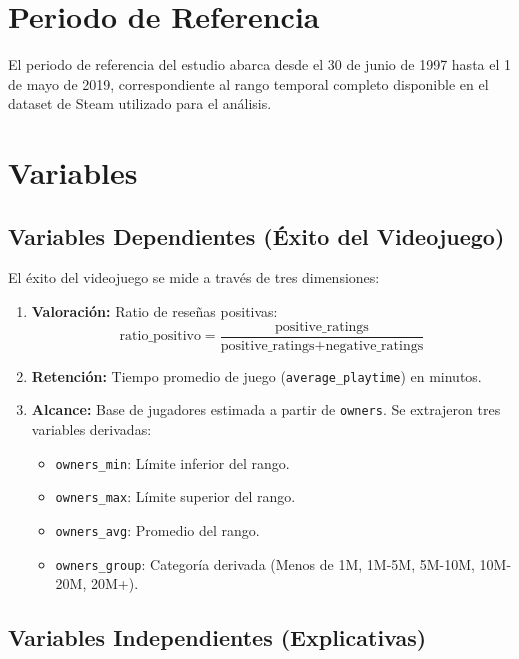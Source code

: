 \documentclass[oneside,11pt]{Latex/Classes/PhDthesisPSnPDF}
\begin{document}
\section{Periodo de Referencia}

El periodo de referencia del estudio abarca desde el 30 de junio de 1997
hasta el 1 de mayo de 2019, correspondiente al rango temporal completo
disponible en el dataset de Steam utilizado para el análisis.

\section{Variables}

\subsection{Variables Dependientes (Éxito del Videojuego)}

El éxito del videojuego se mide a través de tres dimensiones:

\begin{enumerate}
  \item \textbf{Valoración:} Ratio de reseñas positivas:
  $$\text{ratio\_positivo} = \frac{\text{positive\_ratings}}{\text{positive\_ratings} + \text{negative\_ratings}}$$
  
  \item \textbf{Retención:} Tiempo promedio de juego (\texttt{average\_playtime}) en minutos.
  
  \item \textbf{Alcance:} Base de jugadores estimada a partir de \texttt{owners}. Se extrajeron tres variables derivadas:
  \begin{itemize}
    \item \texttt{owners\_min}: Límite inferior del rango.
    \item \texttt{owners\_max}: Límite superior del rango.
    \item \texttt{owners\_avg}: Promedio del rango.
    \item \texttt{owners\_group}: Categoría derivada (Menos de 1M, 1M-5M, 5M-10M, 10M-20M, 20M+).
  \end{itemize}
\end{enumerate}

\subsection{Variables Independientes (Explicativas)}
\end{document}
